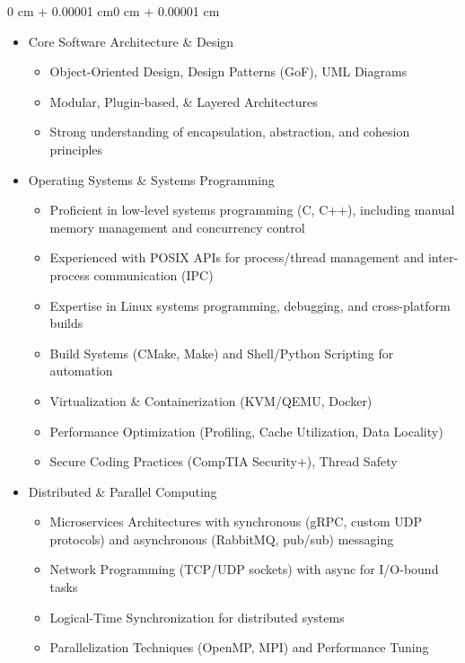 \documentclass[10pt, letterpaper]{article}
\newenvironment{highlights}{
    \begin{itemize}[
        topsep=0.10 cm,
        parsep=0.10 cm,
        partopsep=0pt,
        itemsep=0pt,
        leftmargin=0.4 cm + 10pt
    ]
}{
    \end{itemize}
}
\newenvironment{onecolentry}{
    \begin{adjustwidth}{0 cm + 0.00001 cm}{0 cm + 0.00001 cm}
}{
    \end{adjustwidth}
}
\begin{document}
\begin{onecolentry}
    \begin{highlights}
        \item Core Software Architecture \& Design
        \begin{itemize}
            \item Object-Oriented Design, Design Patterns (GoF), UML Diagrams
            \item Modular, Plugin-based, \& Layered Architectures
            \item Strong understanding of encapsulation, abstraction, and cohesion principles
        \end{itemize}

        \item Operating Systems \& Systems Programming
        \begin{itemize}
            \item Proficient in low-level systems programming (C, C++), including manual memory management and concurrency control
            \item Experienced with POSIX APIs for process/thread management and inter-process communication (IPC)
            \item Expertise in Linux systems programming, debugging, and cross-platform builds
            \item Build Systems (CMake, Make) and Shell/Python Scripting for automation
            \item Virtualization \& Containerization (KVM/QEMU, Docker)
            \item Performance Optimization (Profiling, Cache Utilization, Data Locality)
            \item Secure Coding Practices (CompTIA Security+), Thread Safety
        \end{itemize}

        \item Distributed \& Parallel Computing
        \begin{itemize}
            \item Microservices Architectures with synchronous (gRPC, custom UDP protocols) and asynchronous (RabbitMQ, pub/sub) messaging
            \item Network Programming (TCP/UDP sockets) with async for I/O-bound tasks
            \item Logical-Time Synchronization for distributed systems
            \item Parallelization Techniques (OpenMP, MPI) and Performance Tuning
        \end{itemize}


\end{highlights}
\end{onecolentry}
\end{document}
